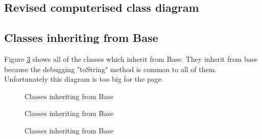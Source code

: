 \begin{appendices}
\begin{landscape}
\section{Revised computerised class diagram}
\subsection{Classes inheriting from Base}
Figure \ref{fig:base} shows all of the classes which inherit from Base. They inherit from base because the debugging "toString" method is common to all of them. Unfortunately this diagram is too big for the page.
\begin{figure}[H]
\caption{Classes inheriting from Base}
\end{figure}
\begin{figure}[H]

\label{fig:base}
\end{figure}
\begin{figure}[H]
  
\caption{Classes inheriting from Base}
\label{fig:base}
\end{figure}
\begin{figure}[H]
  
\caption{Classes inheriting from Base}
\label{fig:base}
\end{figure}

\end{landscape}
\end{appendices}

